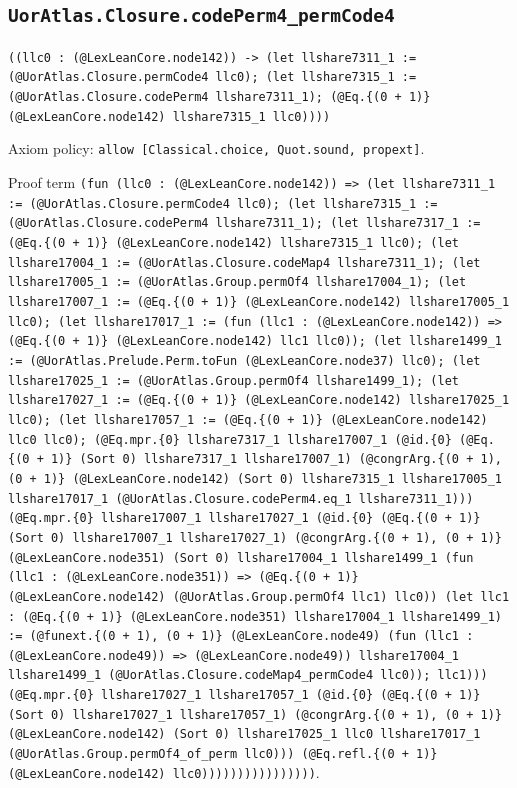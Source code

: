 \documentclass[11pt]{article}
\begin{document}
\subsection*{\texttt{UorAtlas.Closure.codePerm4\_permCode4}}
\noindent\texttt{((llc0 : (@LexLeanCore.node142)) -> (let llshare7311\_1 := (@UorAtlas.Closure.permCode4 llc0); (let llshare7315\_1 := (@UorAtlas.Closure.codePerm4 llshare7311\_1); (@Eq.\{(0 + 1)\} (@LexLeanCore.node142) llshare7315\_1 llc0))))}\par
\noindent Axiom policy: \texttt{allow [Classical.choice, Quot.sound, propext]}.\par
\noindent Proof term \texttt{(fun (llc0 : (@LexLeanCore.node142)) => (let llshare7311\_1 := (@UorAtlas.Closure.permCode4 llc0); (let llshare7315\_1 := (@UorAtlas.Closure.codePerm4 llshare7311\_1); (let llshare7317\_1 := (@Eq.\{(0 + 1)\} (@LexLeanCore.node142) llshare7315\_1 llc0); (let llshare17004\_1 := (@UorAtlas.Closure.codeMap4 llshare7311\_1); (let llshare17005\_1 := (@UorAtlas.Group.permOf4 llshare17004\_1); (let llshare17007\_1 := (@Eq.\{(0 + 1)\} (@LexLeanCore.node142) llshare17005\_1 llc0); (let llshare17017\_1 := (fun (llc1 : (@LexLeanCore.node142)) => (@Eq.\{(0 + 1)\} (@LexLeanCore.node142) llc1 llc0)); (let llshare1499\_1 := (@UorAtlas.Prelude.Perm.toFun (@LexLeanCore.node37) llc0); (let llshare17025\_1 := (@UorAtlas.Group.permOf4 llshare1499\_1); (let llshare17027\_1 := (@Eq.\{(0 + 1)\} (@LexLeanCore.node142) llshare17025\_1 llc0); (let llshare17057\_1 := (@Eq.\{(0 + 1)\} (@LexLeanCore.node142) llc0 llc0); (@Eq.mpr.\{0\} llshare7317\_1 llshare17007\_1 (@id.\{0\} (@Eq.\{(0 + 1)\} (Sort 0) llshare7317\_1 llshare17007\_1) (@congrArg.\{(0 + 1), (0 + 1)\} (@LexLeanCore.node142) (Sort 0) llshare7315\_1 llshare17005\_1 llshare17017\_1 (@UorAtlas.Closure.codePerm4.eq\_1 llshare7311\_1))) (@Eq.mpr.\{0\} llshare17007\_1 llshare17027\_1 (@id.\{0\} (@Eq.\{(0 + 1)\} (Sort 0) llshare17007\_1 llshare17027\_1) (@congrArg.\{(0 + 1), (0 + 1)\} (@LexLeanCore.node351) (Sort 0) llshare17004\_1 llshare1499\_1 (fun (llc1 : (@LexLeanCore.node351)) => (@Eq.\{(0 + 1)\} (@LexLeanCore.node142) (@UorAtlas.Group.permOf4 llc1) llc0)) (let llc1 : (@Eq.\{(0 + 1)\} (@LexLeanCore.node351) llshare17004\_1 llshare1499\_1) := (@funext.\{(0 + 1), (0 + 1)\} (@LexLeanCore.node49) (fun (llc1 : (@LexLeanCore.node49)) => (@LexLeanCore.node49)) llshare17004\_1 llshare1499\_1 (@UorAtlas.Closure.codeMap4\_permCode4 llc0)); llc1))) (@Eq.mpr.\{0\} llshare17027\_1 llshare17057\_1 (@id.\{0\} (@Eq.\{(0 + 1)\} (Sort 0) llshare17027\_1 llshare17057\_1) (@congrArg.\{(0 + 1), (0 + 1)\} (@LexLeanCore.node142) (Sort 0) llshare17025\_1 llc0 llshare17017\_1 (@UorAtlas.Group.permOf4\_of\_perm llc0))) (@Eq.refl.\{(0 + 1)\} (@LexLeanCore.node142) llc0))))))))))))))))}.\par
\end{document}
